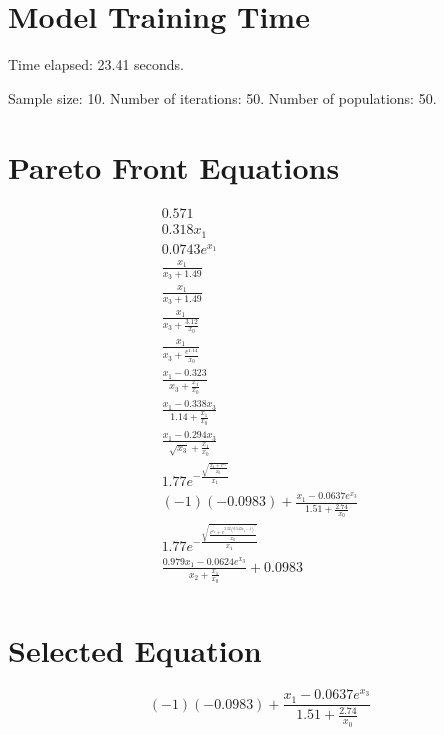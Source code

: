 \documentclass{article}
\begin{document}
\section*{Model Training Time}
Time elapsed: 23.41 seconds.

Sample size: 10.
Number of iterations: 50.
Number of populations: 50.

\section*{Pareto Front Equations}
\begin{align*}
0.571 \\
0.318 x_{1} \\
0.0743 e^{x_{1}} \\
\frac{x_{1}}{x_{3} + 1.49} \\
\frac{x_{1}}{x_{3} + 1.49} \\
\frac{x_{1}}{x_{3} + \frac{3.12}{x_{0}}} \\
\frac{x_{1}}{x_{3} + \frac{e^{1.14}}{x_{0}}} \\
\frac{x_{1} - 0.323}{x_{3} + \frac{x_{1}}{x_{0}}} \\
\frac{x_{1} - 0.338 x_{3}}{1.14 + \frac{x_{1}}{x_{0}}} \\
\frac{x_{1} - 0.294 x_{3}}{\sqrt{x_{3}} + \frac{x_{1}}{x_{0}}} \\
1.77 e^{- \frac{\sqrt{\frac{x_{4} + e^{x_{3}}}{x_{0}}}}{x_{1}}} \\
\left(-1\right) \left(-0.0983\right) + \frac{x_{1} - 0.0637 e^{x_{3}}}{1.51 + \frac{2.74}{x_{0}}} \\
1.77 e^{- \frac{\sqrt{\frac{e^{x_{3}} + e^{3.32 \left(0.549 x_{4} - 1\right)^{2}}}{x_{0}}}}{x_{1}}} \\
\frac{0.979 x_{1} - 0.0624 e^{x_{3}}}{x_{2} + \frac{x_{1}}{x_{0}}} + 0.0983 \\
\end{align*}

\section*{Selected Equation}
\[ \left(-1\right) \left(-0.0983\right) + \frac{x_{1} - 0.0637 e^{x_{3}}}{1.51 + \frac{2.74}{x_{0}}} \]
\end{document}
